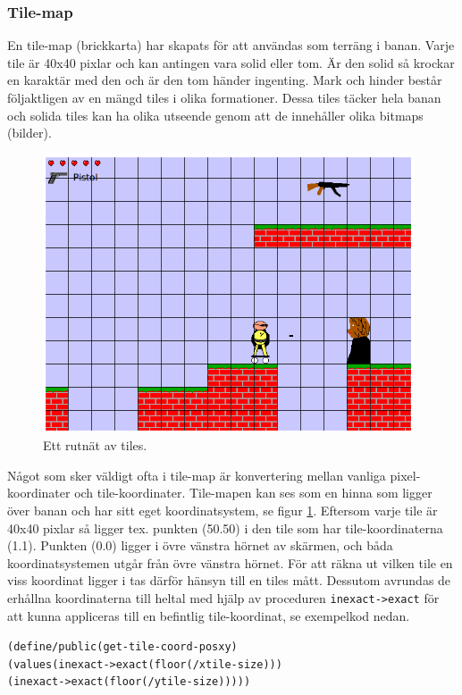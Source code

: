 \documentclass{scrartcl}
\newcommand{\code}[1]%
{\texttt{#1}}
\begin{document}
\subsubsection{Tile-map}
En tile-map (brickkarta) har skapats för att användas som terräng i banan. Varje tile är 40x40 pixlar och kan antingen vara solid eller tom. Är den solid så krockar en karaktär med den och är den tom händer ingenting. Mark och hinder består följaktligen av en mängd tiles i olika formationer. Dessa tiles täcker hela banan och solida tiles kan ha olika utseende genom att de innehåller olika bitmaps (bilder).

\begin{figure}[h!]
\centering
\includegraphics[width=11cm]{tilekoordinater}
\caption{Ett rutnät av tiles.}\label{tile-rutnat}
\end{figure}

Något som sker väldigt ofta i tile-map är konvertering mellan vanliga pixel-koordinater och tile-koordinater. Tile-mapen kan ses som en hinna som ligger över banan och har sitt eget koordinatsystem, se figur \ref{tile-rutnat}. Eftersom varje tile är 40x40 pixlar så ligger tex. punkten (50.50) i den tile som har tile-koordinaterna (1.1). Punkten (0.0) ligger i övre vänstra hörnet av skärmen, och båda koordinatsystemen utgår från övre vänstra hörnet. För att räkna ut vilken tile en viss koordinat ligger i tas därför hänsyn till en tiles mått. Dessutom avrundas de erhållna koordinaterna till heltal med hjälp av proceduren \code{inexact->exact} för att kunna appliceras till en befintlig tile-koordinat, se exempelkod nedan. 
\begin{alltt}
(define/public (get-tile-coord-pos x y) 
      (values (inexact->exact (floor (/ x tile-size)))
              (inexact->exact (floor (/ y tile-size)))))
\end{alltt}         
\end{document}

